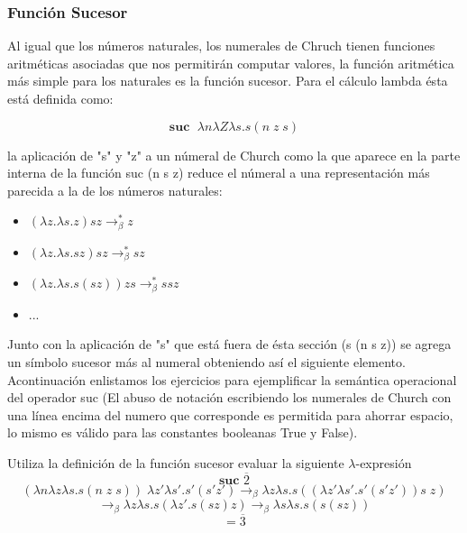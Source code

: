     \subsubsection{Función Sucesor}
        Al igual que los números naturales, los numerales de Chruch tienen funciones aritméticas asociadas que nos permitirán computar valores, la función aritmética más simple para los naturales es la función sucesor. Para el cálculo lambda ésta está definida como:
        \begin{definition}
            $$\textbf{suc } \; \lambda n\lambda Z\lambda s. s(n \; z \; s)$$
        \end{definition}
    
        la aplicación de "s" y "z" a un númeral de Church como la que aparece en la parte interna de la función suc (n s z) reduce el númeral a una representación más parecida a la de los números naturales:    
        \begin{itemize}
            \item $(\lambda z.\lambda s.z)sz \rightarrow_\beta^* z$
            \item $(\lambda z.\lambda s.sz)sz  \rightarrow_\beta^* sz$
            \item $(\lambda z.\lambda s.s(sz))zs \rightarrow_\beta^* ssz$
            \item ...
        \end{itemize}

        Junto con la aplicación de "s" que está fuera de ésta sección (s (n s z)) se agrega un símbolo sucesor más al numeral obteniendo así el siguiente elemento.\\

        Acontinuación enlistamos los ejercicios para ejemplificar la semántica operacional del operador suc (El abuso de notación escribiendo los numerales de Church con una línea encima del numero que corresponde es permitida para ahorrar espacio, lo mismo es válido para las constantes booleanas True y False).

        \bigskip

        \begin{exercise}
            Utiliza la definición de la función sucesor evaluar la siguiente  $\lambda$-expresión
            \[
                \textbf{suc } \overline{2}
            \]
            \[
                (\lambda n\lambda z\lambda s.s(n \; z \; s) ) \; \lambda z'\lambda s'.s'(s'z') \rightarrow_\beta \lambda z\lambda s.s((\lambda z'\lambda s'.s'(s'z')) s \; z)
            \]
            \[
                \rightarrow_\beta \lambda z\lambda s.s(\lambda z'.s(sz) z) \rightarrow_\beta \lambda s\lambda s.s(s(sz))
            \]
            \[
                = \overline{3}
            \]
        \end{exercise}

